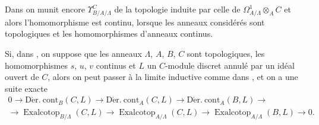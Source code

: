 \begin{env}[20.7.12]
\label{0.20.7.12-fr}
Dans  on munit encore $\Upsilon^C_{B/A/\Lambda}$ de la
topologie induite par celle de $\Omega^1_{A/\Lambda}\otimes_A C$ et alors
l'homomorphisme  est continu, lorsque les anneaux
considérés sont topologiques et les homomorphismes d'anneaux continus.
\end{env}

\begin{env}[20.7.13]
\label{0.20.7.13-fr}
Si, dans , on suppose que les anneaux $\Lambda$, $A$, $B$,
$C$ sont topologiques, les homomorphismes $s$, $u$, $v$ continus et $L$ un
$C$-module discret annulé par un idéal ouvert de $C$, alors on peut passer à
la limite inductive comme dans , et on a une suite exacte
\begin{equation}
\tag{20.7.13.1}
\label{0.20.7.13.1-fr}
\begin{split}
  0\to\operatorname{D\acute{e}r.\ cont}_B(C,L)\to
  \operatorname{D\acute{e}r.\ cont}_A(C,L)\to
  \operatorname{D\acute{e}r.\ cont}_A(B,L)\to \\
  \to\operatorname{Exalcotop}_{B/\Lambda}(C,L)\to
  \operatorname{Exalcotop}_{A/\Lambda}(C,L)\to
  \operatorname{Exalcotop}_{A/\Lambda}(B,L)\to0.
\end{split}
\end{equation}
\end{env}

